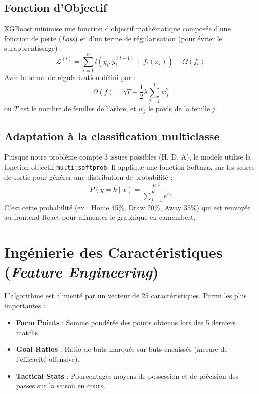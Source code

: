 \documentclass[12pt,a4paper,oneside]{book}
\begin{document}
\subsection{Fonction d'Objectif}
XGBoost minimise une fonction d'objectif mathématique composée d'une fonction de perte (\textit{Loss}) et d'un terme de régularisation (pour éviter le surapprentissage) :
\begin{equation}
    \mathcal{L}^{(t)} = \sum_{i=1}^n l\left(y_i, \hat{y}_i^{(t-1)} + f_t(x_i)\right) + \Omega(f_t)
\end{equation}
Avec le terme de régularisation défini par :
\begin{equation}
    \Omega(f) = \gamma T + \frac{1}{2} \lambda \sum_{j=1}^T w_j^2
\end{equation}
où $T$ est le nombre de feuilles de l'arbre, et $w_j$ le poids de la feuille $j$.

\subsection{Adaptation à la classification multiclasse}
Puisque notre problème compte 3 issues possibles (H, D, A), le modèle utilise la fonction objectif \texttt{multi:softprob}. Il applique une fonction Softmax sur les scores de sortie pour générer une distribution de probabilité :
\begin{equation}
    P(y=k \mid x) = \frac{e^{z_k}}{\sum_{j=1}^K e^{z_j}}
\end{equation}
C'est cette probabilité (ex : Home 45\%, Draw 20\%, Away 35\%) qui est renvoyée au frontend React pour alimenter le graphique en camembert.

\section{Ingénierie des Caractéristiques (\textit{Feature Engineering})}
L'algorithme est alimenté par un vecteur de 25 caractéristiques. Parmi les plus importantes :
\begin{itemize}
    \item \textbf{Form Points} : Somme pondérée des points obtenus lors des 5 derniers matchs.
    \item \textbf{Goal Ratios} : Ratio de buts marqués sur buts encaissés (mesure de l'efficacité offensive).
    \item \textbf{Tactical Stats} : Pourcentages moyens de possession et de précision des passes sur la saison en cours.
\end{itemize}
\end{document}

